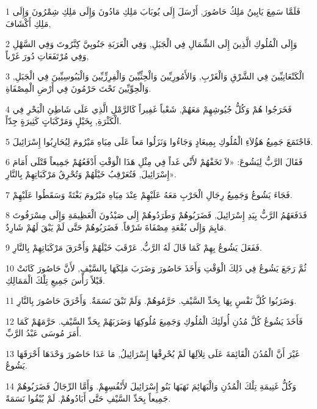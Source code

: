 \par 1 فَلَمَّا سَمِعَ يَابِينُ مَلِكُ حَاصُورَ, أَرْسَلَ إِلَى يُوبَابَ مَلِكِ مَادُونَ وَإِلَى مَلِكِ شِمْرُونَ وَإِلَى مَلِكِ أَكْشَافَ,
\par 2 وَإِلَى الْمُلُوكِ الَّذِينَ إِلَى الشِّمَالِ فِي الْجَبَلِ, وَفِي الْعَرَبَةِ جَنُوبِيَّ كِنَّرُوتَ وَفِي السَّهْلِ وَفِي مُرْتَفَعَاتِ دُورَ غَرْباً,
\par 3 الْكَنْعَانِيِّينَ فِي الشَّرْقِ وَالْغَرْبِ, وَالأَمُورِيِّينَ وَالْحِثِّيِّينَ وَالْفِرِزِّيِّينَ وَالْيَبُوسِيِّينَ فِي الْجَبَلِ, وَالْحِوِّيِّينَ تَحْتَ حَرْمُونَ فِي أَرْضِ الْمِصْفَاةِ.
\par 4 فَخَرَجُوا هُمْ وَكُلُّ جُيُوشِهِمْ مَعَهُمْ, شَعْباً غَفِيراً كَالرَّمْلِ الَّذِي عَلَى شَاطِئِ الْبَحْرِ فِي الْكَثْرَةِ, بِخَيْلٍ وَمَرْكَبَاتٍ كَثِيرَةٍ جِدّاً.
\par 5 فَاجْتَمَعَ جَمِيعُ هَؤُلاَءِ الْمُلُوكِ بِمِيعَادٍ وَجَاءُوا وَنَزَلُوا مَعاً عَلَى مِيَاهِ مَيْرُومَ لِيُحَارِبُوا إِسْرَائِيلَ.
\par 6 فَقَالَ الرَّبُّ لِيَشُوعَ: «لاَ تَخَفْهُمْ لأَنِّي غَداً فِي مِثْلِ هَذَا الْوَقْتِ أَدْفَعُهُمْ جَمِيعاً قَتْلَى أَمَامَ إِسْرَائِيلَ, فَتُعَرْقِبُ خَيْلَهُمْ وَتُحْرِقُ مَرْكَبَاتِهِمْ بِالنَّارِ».
\par 7 فَجَاءَ يَشُوعُ وَجَمِيعُ رِجَالِ الْحَرْبِ مَعَهُ عَلَيْهِمْ عِنْدَ مِيَاهِ مَيْرُومَ بَغْتَةً وَسَقَطُوا عَلَيْهِمْ.
\par 8 فَدَفَعَهُمُ الرَّبُّ بِيَدِ إِسْرَائِيلَ, فَضَرَبُوهُمْ وَطَرَدُوهُمْ إِلَى صَيْدُونَ الْعَظِيمَةِ وَإِلَى مِسْرَفُوتَ مَايِمَ وَإِلَى بُقْعَةِ مِصْفَاةَ شَرْقاً. فَضَرَبُوهُمْ حَتَّى لَمْ يَبْقَ لَهُمْ شَارِدٌ.
\par 9 فَفَعَلَ يَشُوعُ بِهِمْ كَمَا قَالَ لَهُ الرَّبُّ. عَرْقَبَ خَيْلَهُمْ وَأَحْرَقَ مَرْكَبَاتِهِمْ بِالنَّارِ.
\par 10 ثُمَّ رَجَعَ يَشُوعُ فِي ذَلِكَ الْوَقْتِ وَأَخَذَ حَاصُورَ وَضَرَبَ مَلِكَهَا بِالسَّيْفِ, لأَنَّ حَاصُورَ كَانَتْ قَبْلاً رَأْسَ جَمِيعِ تِلْكَ الْمَمَالِكِ.
\par 11 وَضَرَبُوا كُلَّ نَفْسٍ بِهَا بِحَدِّ السَّيْفِ. حَرَّمُوهُمْ. وَلَمْ تَبْقَ نَسَمَةٌ. وَأَحْرَقَ حَاصُورَ بِالنَّارِ.
\par 12 فَأَخَذَ يَشُوعُ كُلَّ مُدُنِ أُولَئِكَ الْمُلُوكِ وَجَمِيعَ مُلُوكِهَا وَضَرَبَهُمْ بِحَدِّ السَّيْفِ. حَرَّمَهُمْ كَمَا أَمَرَ مُوسَى عَبْدُ الرَّبِّ.
\par 13 غَيْرَ أَنَّ الْمُدُنَ الْقَائِمَةَ عَلَى تِلاَلِهَا لَمْ يُحْرِقْهَا إِسْرَائِيلُ, مَا عَدَا حَاصُورَ وَحْدَهَا أَحْرَقَهَا يَشُوعُ.
\par 14 وَكُلُّ غَنِيمَةِ تِلْكَ الْمُدُنِ وَالْبَهَائِمَ نَهَبَهَا بَنُو إِسْرَائِيلَ لأَنْفُسِهِمْ. وَأَمَّا الرِّجَالُ فَضَرَبُوهُمْ جَمِيعاً بِحَدِّ السَّيْفِ حَتَّى أَبَادُوهُمْ. لَمْ يُبْقُوا نَسَمَةً.
